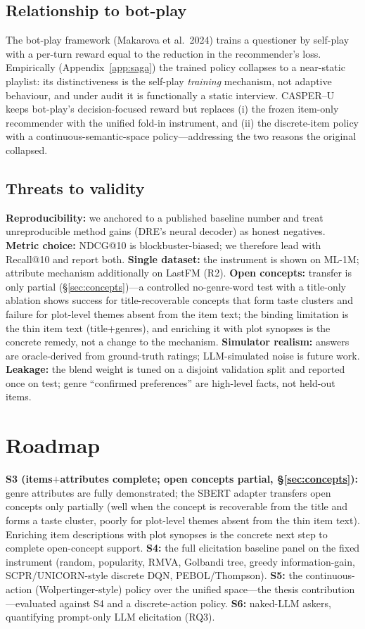 \subsection{Relationship to bot-play}
The bot-play framework (Makarova et al.\ 2024) trains a questioner by self-play with a per-turn reward equal to the
reduction in the recommender's loss. Empirically (Appendix~\ref{app:saga}) the trained policy collapses to a
near-static playlist: its distinctiveness is the self-play \emph{training} mechanism, not adaptive behaviour, and
under audit it is functionally a static interview. CASPER--U keeps bot-play's decision-focused reward but replaces
(i) the frozen item-only recommender with the unified fold-in instrument, and (ii) the discrete-item policy with a
continuous-semantic-space policy---addressing the two reasons the original collapsed.

\subsection{Threats to validity}
\textbf{Reproducibility:} we anchored to a published baseline number and treat unreproducible method gains (DRE's
neural decoder) as honest negatives. \textbf{Metric choice:} NDCG@10 is blockbuster-biased; we therefore lead with
Recall@10 and report both. \textbf{Single dataset:} the instrument is shown on ML-1M; attribute mechanism
additionally on LastFM (R2). \textbf{Open concepts:} transfer is only partial (\S\ref{sec:concepts})---a controlled
no-genre-word test with a title-only ablation shows success for title-recoverable concepts that form taste clusters
and failure for plot-level themes absent from the item text; the binding limitation is the thin item text
(title$+$genres), and enriching it with plot synopses is the concrete remedy, not a change to the mechanism. \textbf{Simulator realism:} answers are oracle-derived from ground-truth ratings;
LLM-simulated noise is future work. \textbf{Leakage:} the blend weight is tuned on a disjoint validation split and
reported once on test; genre ``confirmed preferences'' are high-level facts, not held-out items.

\section{Roadmap}\label{sec:roadmap}
\textbf{S3 (items$+$attributes complete; open concepts partial, \S\ref{sec:concepts}):} genre attributes are fully
demonstrated; the SBERT adapter transfers open concepts only partially (well when the concept is recoverable from
the title and forms a taste cluster, poorly for plot-level themes absent from the thin item text). Enriching item
descriptions with plot synopses is the concrete next step to complete open-concept support.
\textbf{S4:} the full elicitation baseline panel on the fixed instrument (random, popularity, RMVA, Golbandi tree,
greedy information-gain, SCPR/UNICORN-style discrete DQN, PEBOL/Thompson). \textbf{S5:} the continuous-action
(Wolpertinger-style) policy over the unified space---the thesis contribution---evaluated against S4 and a
discrete-action policy. \textbf{S6:} naked-LLM askers, quantifying prompt-only LLM elicitation (RQ3).

